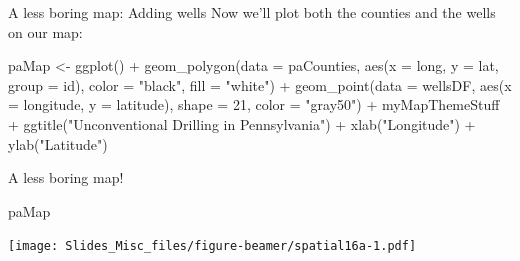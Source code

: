 \documentclass[
  ignorenonframetext,
]{beamer}
\newenvironment{Shaded}{\begin{snugshade}}{\end{snugshade}}
\newcommand{\AttributeTok}[1]{\textcolor[rgb]{0.77,0.63,0.00}{#1}}
\newcommand{\DecValTok}[1]{\textcolor[rgb]{0.00,0.00,0.81}{#1}}
\newcommand{\FunctionTok}[1]{\textcolor[rgb]{0.00,0.00,0.00}{#1}}
\newcommand{\NormalTok}[1]{#1}
\newcommand{\OtherTok}[1]{\textcolor[rgb]{0.56,0.35,0.01}{#1}}
\newcommand{\SpecialCharTok}[1]{\textcolor[rgb]{0.00,0.00,0.00}{#1}}
\newcommand{\StringTok}[1]{\textcolor[rgb]{0.31,0.60,0.02}{#1}}
\begin{document}
\begin{frame}[fragile]{A less boring map: Adding wells}
\protect\hypertarget{a-less-boring-map-adding-wells-3}{}
Now we'll plot both the counties and the wells on our map:

\tiny

\begin{Shaded}
\begin{Highlighting}[]
\NormalTok{paMap }\OtherTok{\textless{}{-}} \FunctionTok{ggplot}\NormalTok{() }\SpecialCharTok{+}
    \FunctionTok{geom\_polygon}\NormalTok{(}\AttributeTok{data =}\NormalTok{ paCounties, }\FunctionTok{aes}\NormalTok{(}\AttributeTok{x =}\NormalTok{ long, }\AttributeTok{y =}\NormalTok{ lat, }\AttributeTok{group =}\NormalTok{ id),}
                 \AttributeTok{color =} \StringTok{"black"}\NormalTok{, }\AttributeTok{fill =} \StringTok{"white"}\NormalTok{) }\SpecialCharTok{+}
    \FunctionTok{geom\_point}\NormalTok{(}\AttributeTok{data =}\NormalTok{ wellsDF, }\FunctionTok{aes}\NormalTok{(}\AttributeTok{x =}\NormalTok{ longitude, }\AttributeTok{y =}\NormalTok{ latitude),}
               \AttributeTok{shape =} \DecValTok{21}\NormalTok{, }\AttributeTok{color =} \StringTok{"gray50"}\NormalTok{) }\SpecialCharTok{+}
\NormalTok{    myMapThemeStuff }\SpecialCharTok{+} 
    \FunctionTok{ggtitle}\NormalTok{(}\StringTok{"Unconventional Drilling in Pennsylvania"}\NormalTok{) }\SpecialCharTok{+}
    \FunctionTok{xlab}\NormalTok{(}\StringTok{"Longitude"}\NormalTok{) }\SpecialCharTok{+} 
    \FunctionTok{ylab}\NormalTok{(}\StringTok{"Latitude"}\NormalTok{)}
\end{Highlighting}
\end{Shaded}
\end{frame}

\begin{frame}[fragile]{A less boring map!}
\protect\hypertarget{a-less-boring-map}{}
\begin{Shaded}
\begin{Highlighting}[]
\NormalTok{paMap}
\end{Highlighting}
\end{Shaded}

\texttt{[image: Slides\_Misc\_files/figure-beamer/spatial16a-1.pdf]}
\end{frame}
\end{document}
